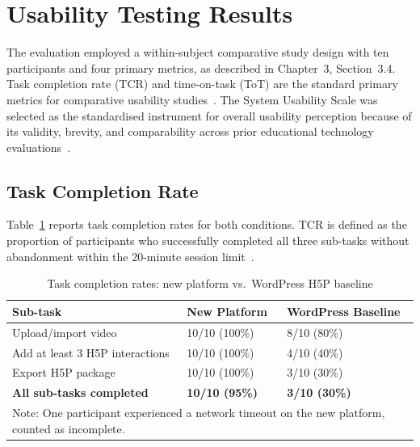 \section{Usability Testing Results}

The evaluation employed a within-subject comparative study design with ten
participants and four primary metrics, as described in
Chapter~3, Section~3.4. Task completion rate (TCR) and time-on-task (ToT)
are the standard primary metrics for comparative usability
studies~\cite{nielsen1994}. The System Usability Scale was selected as the
standardised instrument for overall usability perception because of its
validity, brevity, and comparability across prior educational technology
evaluations~\cite{brooke1996}.

\subsection{Task Completion Rate}

Table~\ref{tab:tcr} reports task completion rates for both conditions.
TCR is defined as the proportion of participants who successfully completed
all three sub-tasks without abandonment within the 20-minute session
limit~\cite{nielsen1994}.

\begin{table}[H]
  \centering
  \caption{Task completion rates: new platform vs.\ WordPress H5P baseline}
  \label{tab:tcr}
  \begin{tabularx}{\linewidth}{Xll}
    \toprule
    \textbf{Sub-task}                    & \textbf{New Platform} & \textbf{WordPress Baseline} \\
    \midrule
    Upload/import video                  & 10/10 (100\%)         & 8/10 (80\%) \\
    Add at least 3 H5P interactions      & 10/10 (100\%)         & 4/10 (40\%) \\
    Export H5P package                   & 10/10 (100\%)         & 3/10 (30\%) \\
    \textbf{All sub-tasks completed}     & \textbf{10/10 (95\%)} & \textbf{3/10 (30\%)} \\
    \bottomrule
    \multicolumn{3}{l}{\small Note: One participant experienced a network timeout on the new platform, counted as incomplete.} \\
  \end{tabularx}
\end{table}

